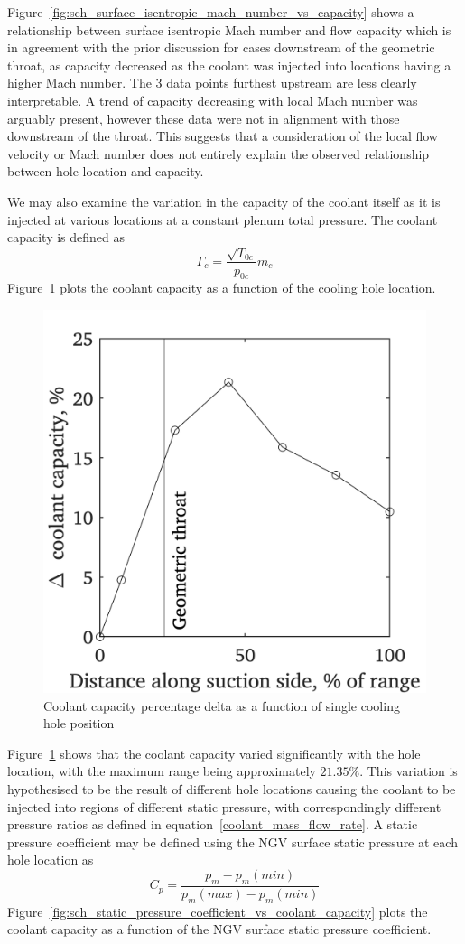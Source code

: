\documentclass[a4paper, 11pt, oneside]{report}
\begin{document}
Figure~\ref{fig:sch_surface_isentropic_mach_number_vs_capacity} shows a relationship between surface isentropic Mach number and flow capacity which is in agreement with the prior discussion for cases downstream of the geometric throat, as capacity decreased as the coolant was injected into locations having a higher Mach number. The 3 data points furthest upstream are less clearly interpretable. A trend of capacity decreasing with local Mach number was arguably present, however these data were not in alignment with those downstream of the throat. This suggests that a consideration of the local flow velocity or Mach number does not entirely explain the observed relationship between hole location and capacity.

We may also examine the variation in the capacity of the coolant itself as it is injected at various locations at a constant plenum total pressure. The coolant capacity is defined as
\begin{equation}
\Gamma_c =
\frac{\sqrt{T_{0c}}}{p_{0c}}
\dot{m_c}
\end{equation}
Figure~\ref{fig:sch_hole_location_vs_coolant_capacity} plots the coolant capacity as a function of the cooling hole location.

\begin{figure}[H]
      \centering
      \includegraphics[width=.45\textwidth]{figs/sch_hole_location_vs_coolant_capacity.png}
      \caption{Coolant capacity percentage delta as a function of single cooling hole position}
      \label{fig:sch_hole_location_vs_coolant_capacity}
\end{figure}

Figure~\ref{fig:sch_hole_location_vs_coolant_capacity} shows that the coolant capacity varied significantly with the hole location, with the maximum range being approximately $21.35\%$. This variation is hypothesised to be the result of different hole locations causing the coolant to be injected into regions of different static pressure, with correspondingly different pressure ratios as defined in equation~\ref{coolant_mass_flow_rate}. A static pressure coefficient may be defined using the NGV surface static pressure at each hole location as
\begin{equation}
C_p =
\frac{
p_m - p_m\left(min\right)
}{
p_m\left(max\right) - p_m\left(min\right)
}
\end{equation}
Figure~\ref{fig:sch_static_pressure_coefficient_vs_coolant_capacity} plots the coolant capacity as a function of the NGV surface static pressure coefficient.
\end{document}
